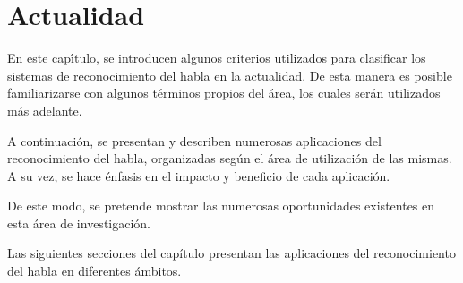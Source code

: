 \chapter{Actualidad}
\label{sec:areas-aplicacion}
En este cap{\'\i}tulo, se introducen algunos criterios utilizados para clasificar los sistemas
de reconocimiento del habla en la actualidad. De esta manera es posible familiarizarse con
algunos t\'erminos propios del \'area, los cuales ser\'an utilizados m\'as adelante.

A continuaci\'on, se presentan y describen numerosas aplicaciones del reconocimiento del habla, 
organizadas seg\'un el \'area de utilizaci\'on de las mismas. A su vez, se hace \'enfasis en el impacto 
y beneficio de cada aplicaci\'on.

De este modo, se pretende mostrar las numerosas oportunidades existentes en esta \'area de investigaci\'on.



Las siguientes secciones del cap\'itulo presentan las aplicaciones del reconocimiento del habla 
en diferentes \'ambitos.









